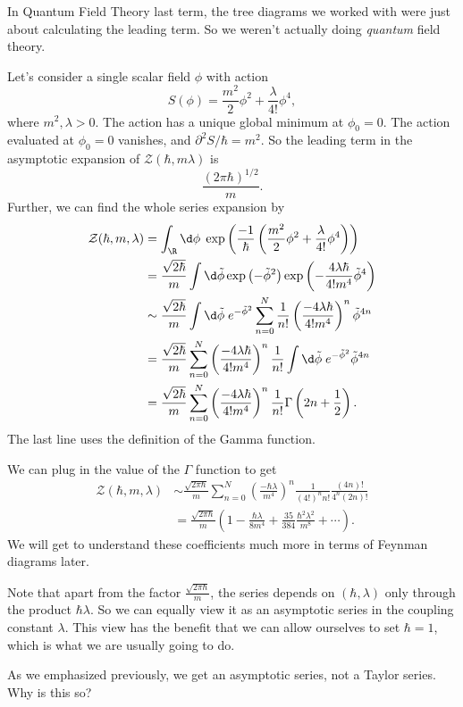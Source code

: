 \documentclass[a4paper]{article}
\begin{document}
In Quantum Field Theory last term, the tree diagrams we worked with were just about calculating the leading term. So we weren't actually doing \emph{quantum} field theory.

\begin{eg}
  Let's consider a single scalar field $\phi$ with action
  \[
    S(\phi) = \frac{m^2}{2}\phi^2 + \frac{\lambda}{4!} \phi^4,
  \]
  where $m^2, \lambda > 0$. The action has a unique global minimum at $\phi_0 = 0$. The action evaluated at $\phi_0 = 0$ vanishes, and $\partial^2 S/\hbar = m^2$. So the leading term in the asymptotic expansion of $\mathcal{Z}(\hbar, m \lambda)$ is
  \[
    \frac{(2\pi \hbar)^{1/2}}{m}.
  \]
  Further, we can find the whole series expansion by
  \begin{align*}
    \mathcal{Z}(\hbar, m, \lambda) &= \int_\R \d \phi \; \exp\left(\frac{-1}{\hbar}\left(\frac{m^2}{2} \phi^2 + \frac{\lambda}{4!}\phi^4\right)\right)\\
    &= \frac{\sqrt{2\hbar}}{m} \int \d \tilde{\phi} \exp\left(-\tilde{\phi}^2 \right) \exp\left( - \frac{4\lambda \hbar}{4! m^4} \tilde{\phi}^4\right)\\
    &\sim \frac{\sqrt{2\hbar}}{m} \int \d \tilde{\phi}\; e^{- \tilde{\phi}^2}\sum_{n = 0}^N \frac{1}{n!} \left(\frac{-4\lambda \hbar}{4! m^4}\right)^n \tilde{\phi}^{4n}\\
    &= \frac{\sqrt{2\hbar}}{m} \sum_{n = 0}^N \left(\frac{-4\lambda \hbar}{4! m^4}\right)^n \frac{1}{n!} \int \d \tilde{\phi}\;e^{- \tilde{\phi}^2}\tilde{\phi}^{4n}\\
    &= \frac{\sqrt{2\hbar}}{m} \sum_{n = 0}^N \left(\frac{-4\lambda \hbar}{4! m^4}\right)^n \frac{1}{n!} \Gamma\left(2n + \frac{1}{2}\right).
  \end{align*}
  The last line uses the definition of the Gamma function.

  We can plug in the value of the $\Gamma$ function to get
  \begin{align*}
    \mathcal{Z}(\hbar, m, \lambda) &\sim \frac{\sqrt{2\pi\hbar}}{m} \sum_{n = 0}^N \left(\frac{-\hbar \lambda}{m^4}\right)^n \frac{1}{(4!)^n n!} \frac{(4n)!}{4^n (2n)!}\\
    &= \frac{\sqrt{2\pi \hbar}}{m} \left(1 - \frac{\hbar\lambda}{8m^4} + \frac{35}{384} \frac{\hbar^2 \lambda^2}{m^8} + \cdots\right).
  \end{align*}
  We will get to understand these coefficients much more in terms of Feynman diagrams later.

  Note that apart from the factor $\frac{\sqrt{2\pi \hbar}}{m}$, the series depends on $(\hbar, \lambda)$ only through the product $\hbar \lambda$. So we can equally view it as an asymptotic series in the coupling constant $\lambda$. This view has the benefit that we can allow ourselves to set $\hbar = 1$, which is what we are usually going to do.
\end{eg}
As we emphasized previously, we get an asymptotic series, not a Taylor series. Why is this so?
\end{document}
